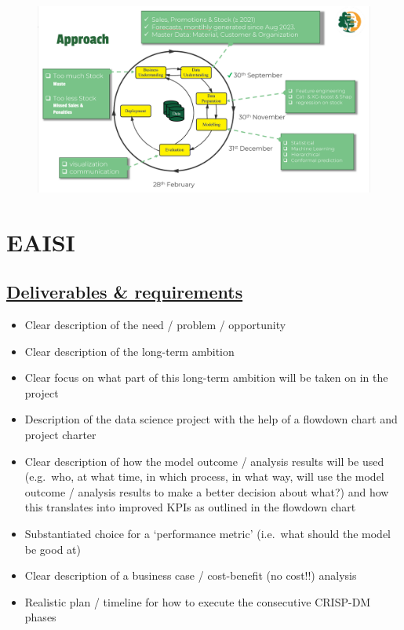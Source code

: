 \documentclass[
  american,
  10,
  a4paper,
]{book}
\providecommand{\tightlist}{%
  \setlength{\itemsep}{0pt}\setlength{\parskip}{0pt}}
\theoremstyle{definition}
\theoremstyle{remark}
\begin{document}
\begin{landscape}
\begin{figure}[H]
{\centering \includegraphics[width=0.8\linewidth,height=\textheight,keepaspectratio]{nb/../images/approach.png}

}

\end{figure}%

\newpage{}

\end{landscape}

\section{EAISI}\label{sec-eaisi}

\subsection{\texorpdfstring{\href{https://academy.eaisi.nl/l/41851394}{Deliverables
\&
requirements}}{Deliverables \& requirements}}\label{deliverables-requirements}

\begin{itemize}
\tightlist
\item
  Clear description of the need / problem / opportunity
\item
  Clear description of the long-term ambition
\item
  Clear focus on what part of this long-term ambition will be taken on
  in the project
\item
  Description of the data science project with the help of a flowdown
  chart and project charter
\item
  Clear description of how the model outcome / analysis results will be
  used (e.g.~who, at what time, in which process, in what way, will use
  the model outcome / analysis results to make a better decision about
  what?) and how this translates into improved KPIs as outlined in the
  flowdown chart
\item
  Substantiated choice for a `performance metric' (i.e.~what should the
  model be good at)
\item
  Clear description of a business case / cost-benefit (no cost!!)
  analysis
\item
  Realistic plan / timeline for how to execute the consecutive CRISP-DM
  phases
\end{itemize}
\end{document}
